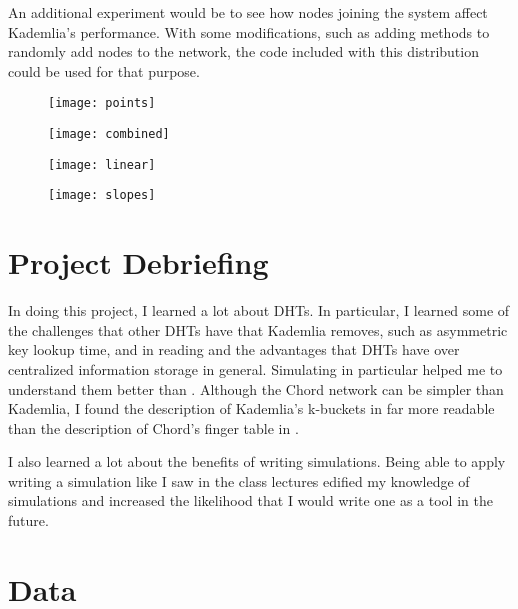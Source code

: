 \documentclass[notitlepage,12pt]{article}
\begin{document}
An additional experiment would be to see how nodes joining the system affect
Kademlia's performance. With some modifications, such as adding methods to
randomly add nodes to the network, the code included with this distribution
could be used for that purpose. 

\begin{figure}[htdp]
  \centering
  \texttt{[image: points]}
  \label{fig:points}
\end{figure}

\begin{figure}[htdp]
  \centering
  \texttt{[image: combined]}
  \label{fig:combined}
\end{figure}

\begin{figure}[htdp]
  \centering
  \texttt{[image: linear]}
  \label{fig:linear}
\end{figure}

\begin{figure}[htdp]
  \centering
  \texttt{[image: slopes]}
  \label{fig:slopes}
\end{figure}

\section{Project Debriefing}
\label{sec:debrief}

In doing this project, I learned a lot about DHTs. In particular, I learned some
of the challenges that other DHTs have that Kademlia removes, such as asymmetric
key lookup time, and in reading \cite{i2p} and \cite{kademlia} the advantages
that DHTs have over centralized information storage in general. Simulating
\cite{kademlia} in particular helped me to understand them better than
\cite{chord}. Although the Chord network can be simpler than Kademlia, I found
the description of Kademlia's k-buckets in \cite{kademlia} far more readable than
the description of Chord's finger table in \cite{chord}. 

I also learned a lot about the benefits of writing simulations. Being able to
apply writing a simulation like I saw in the class lectures edified my knowledge
of simulations and increased the likelihood that I would write one as a tool in
the future. 

\section{Data}
\label{sec:data}
\end{document}
